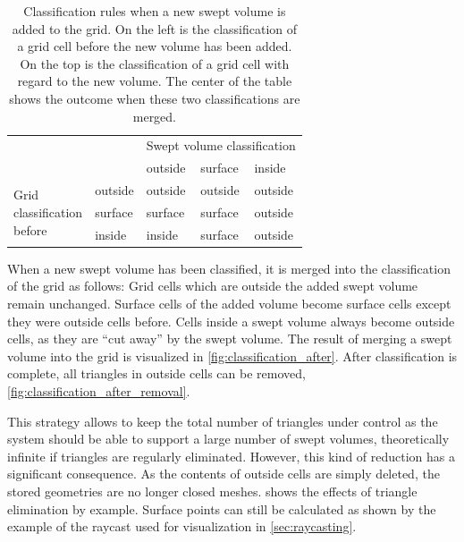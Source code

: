 \begin{table}[h]
	\centering
	\begin{tabular}{p{2.2cm}p{2cm}|p{2cm}p{2cm}p{2cm}}
		                                                                  &         & \multicolumn{3}{l}{Swept volume classification} \\
		                                                                  &         & outside & surface & inside                      \\
		\midrule                                                                                                                    
		\multirow{3}{*}{\parbox{2.2cm}{Grid \\ classification \\ before}} & outside & outside & outside & outside                     \\
		                                                                  & surface & surface & surface & outside                     \\
		                                                                  & inside  & inside  & surface & outside                     
	\end{tabular}
	\caption[Classification rules]{
		Classification rules when a new swept volume is added to the grid.
		On the left is the classification of a grid cell before the new volume has been added.
		On the top is the classification of a grid cell with regard to the new volume.
		The center of the table shows the outcome when these two classifications are merged.
	}
	\label{tbl:classification_rules}
\end{table}

When a new swept volume has been classified, it is merged into the classification of the grid as follows:
Grid cells which are outside the added swept volume remain unchanged.
Surface cells of the added volume become surface cells except they were outside cells before.
Cells inside a swept volume always become outside cells, as they are \enquote{cut away} by the swept volume.
The result of merging a swept volume into the grid is visualized in \cref{fig:classification_after}.
After classification is complete, all triangles in outside cells can be removed, \cf \cref{fig:classification_after_removal}.

This strategy allows to keep the total number of triangles under control as the system should be able to support a large number of swept volumes, theoretically infinite if triangles are regularly eliminated.
%
However, this kind of reduction has a significant consequence.
As the contents of outside cells are simply deleted, the stored geometries are no longer closed meshes.
 shows the effects of triangle elimination by example.
Surface points can still be calculated as shown by the example of the raycast used for visualization in \cref{sec:raycasting}.

